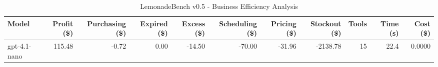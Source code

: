 \begin{table}[h]
\centering
\caption{LemonadeBench v0.5 - Business Efficiency Analysis}
\label{tab:lemonadebench_v05_efficiency}
\begin{tabular}{|l|r|r|r|r|r|r|r|r|r|r|}
\hline
\textbf{Model} & \textbf{Profit (\$)} & \textbf{Purchasing (\$)} & \textbf{Expired (\$)} & \textbf{Excess (\$)} & \textbf{Scheduling (\$)} & \textbf{Pricing (\$)} & \textbf{Stockout (\$)} & \textbf{Tools} & \textbf{Time (s)} & \textbf{Cost (\$)} \\
\hline
gpt-4.1-nano & 115.48 & -0.72 & 0.00 & -14.50 & -70.00 & -31.96 & -2138.78 & 15 & 22.4 & 0.0000 \\
\hline
\end{tabular}
\end{table}